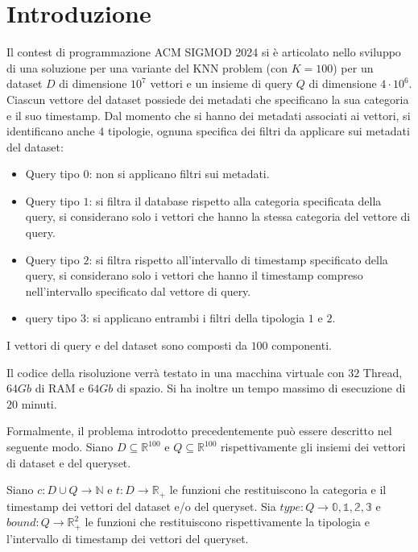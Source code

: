 \chapter{Introduzione}

Il contest di programmazione ACM SIGMOD 2024 si è articolato nello sviluppo di una soluzione 
per una variante del KNN problem (con $K=100$) per un dataset $D$ di dimensione 
$10^7$ vettori e un insieme di query $Q$ di dimensione $4\cdot 10^6$. Ciascun 
vettore del dataset possiede dei metadati che specificano la sua categoria e il
suo timestamp. Dal momento che si hanno dei metadati associati ai vettori, si 
identificano anche $4$ tipologie, ognuna specifica dei filtri da applicare sui 
metadati del dataset:
\begin{itemize}
    \item Query tipo $0$: non si applicano filtri sui metadati.
    \item Query tipo $1$: si filtra il database rispetto alla categoria specificata della query, si considerano 
    solo i vettori che hanno la stessa categoria del vettore di query.
    \item Query tipo $2$: si filtra rispetto all'intervallo di timestamp specificato della query,
    si considerano solo i vettori che hanno il timestamp compreso nell'intervallo 
    specificato dal vettore di query.
    \item query tipo $3$: si applicano entrambi i filtri della tipologia $1$ e $2$.
\end{itemize}

I vettori di query e del dataset sono composti da $100$ componenti.

Il codice della risoluzione verrà testato in una macchina virtuale con $32$ Thread,
$64Gb$ di RAM e $64Gb$ di spazio. Si ha inoltre un tempo massimo di esecuzione 
di $20$ minuti.

Formalmente, il problema introdotto precedentemente può essere descritto nel 
seguente modo. Siano $D\subseteq \mathbb{R}^{100}$ e $Q\subseteq \mathbb{R}^{100}$
rispettivamente gli insiemi dei vettori di dataset e del queryset.

Siano $c:D\cup Q\to \mathbb{N}$ e $t:D\to \mathbb{R}_+$ le funzioni che restituiscono 
la categoria e il timestamp dei vettori del dataset e/o del queryset.
Sia $type: Q\to \mathbb{0, 1, 2, 3}$ e $bound:Q \to \mathbb{R}^2_+$ le funzioni
che restituiscono rispettivamente la tipologia e l'intervallo di timestamp dei 
vettori del queryset.

